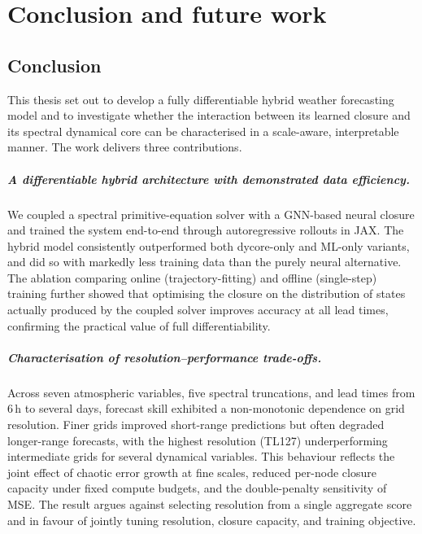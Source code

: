 \chapter{Conclusion and future work}
\label{CAFW}

\section{Conclusion}

This thesis set out to develop a fully differentiable hybrid weather forecasting model and to investigate whether the interaction between its learned closure and its spectral dynamical core can be characterised in a scale-aware, interpretable manner. The work delivers three contributions.

\paragraph{A differentiable hybrid architecture with demonstrated data efficiency.}
We coupled a spectral primitive-equation solver with a GNN-based neural closure and trained the system end-to-end through autoregressive rollouts in JAX. The hybrid model consistently outperformed both dycore-only and ML-only variants, and did so with markedly less training data than the purely neural alternative. The ablation comparing online (trajectory-fitting) and offline (single-step) training further showed that optimising the closure on the distribution of states actually produced by the coupled solver improves accuracy at all lead times, confirming the practical value of full differentiability.

\paragraph{Characterisation of resolution--performance trade-offs.}
Across seven atmospheric variables, five spectral truncations, and lead times from 6\,h to several days, forecast skill exhibited a non-monotonic dependence on grid resolution. Finer grids improved short-range predictions but often degraded longer-range forecasts, with the highest resolution (TL127) underperforming intermediate grids for several dynamical variables. This behaviour reflects the joint effect of chaotic error growth at fine scales, reduced per-node closure capacity under fixed compute budgets, and the double-penalty sensitivity of MSE. The result argues against selecting resolution from a single aggregate score and in favour of jointly tuning resolution, closure capacity, and training objective.


